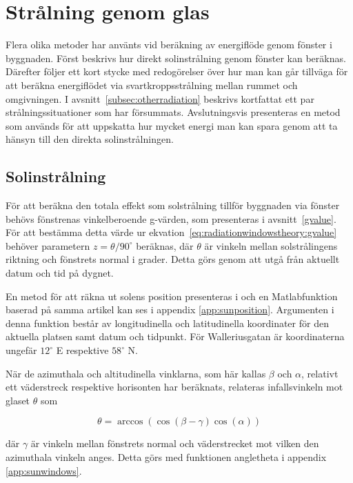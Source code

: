 \section{Strålning genom glas}\label{sec:sunthroughwindowsmethod}

Flera olika metoder har använts vid beräkning av energiflöde genom fönster i byggnaden. Först beskrivs hur direkt solinstrålning genom fönster kan beräknas. Därefter följer ett kort stycke med redogörelser över hur man kan går tillväga för att beräkna energiflödet via svartkroppsstrålning mellan rummet och omgivningen. I avsnitt~\ref{subsec:otherradiation} beskrivs kortfattat ett par strålningssituationer som har försummats. Avslutningsvis presenteras en metod som används för att uppskatta hur mycket energi man kan spara genom att ta hänsyn till den direkta solinstrålningen.

\subsection{Solinstrålning}
För att beräkna den totala effekt som solstrålning tillför byggnaden via fönster behövs fönstrenas vinkelberoende g-värden, som presenteras i avsnitt~\ref{gvalue}. För att bestämma detta värde ur ekvation~\eqref{eq:radiationwindowstheory:gvalue} behöver parametern $z = \theta/90^\circ$ beräknas, där $\theta$ är vinkeln mellan solstrålingens riktning och fönstrets normal i grader. Detta görs genom att utgå från aktuellt datum och tid på dygnet.

En metod för att räkna ut solens position presenteras i \cite{walraven78} och en Matlabfunktion baserad på samma artikel kan ses i appendix \ref{app:sunposition}. Argumenten i denna funktion består av longitudinella och latitudinella koordinater för den aktuella platsen samt datum och tidpunkt. För Walleriusgatan är koordinaterna ungefär $12^\circ$ E respektive $58^\circ$ N.

När de azimuthala och altitudinella vinklarna, som här kallas $\beta$ och $\alpha$, relativt ett väderstreck respektive horisonten har beräknats, relateras infallsvinkeln mot glaset $\theta$ som

\begin{equation} 
\theta = \arccos{\left( \cos{\left(\beta - \gamma\right)}\cos{\left(\alpha\right)}\right)}
\end{equation}

där $\gamma$ är vinkeln mellan fönstrets normal och väderstrecket mot vilken den azimuthala vinkeln anges. Detta görs med funktionen angletheta i appendix \ref{app:sunwindows}.

